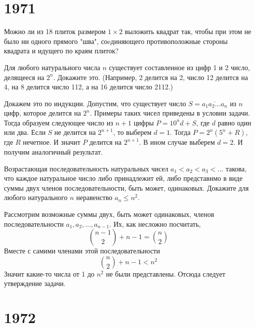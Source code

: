 \documentclass[11pt, a4paper]{template}
\begin{document}
\chapter{1971}

\begin{exercise}[M63]
Можно ли из 18 плиток размером $1 \times 2$ выложить квадрат так, чтобы при этом не было ни одного прямого "шва", соeдиняющего противоположные стороны квадрата и идущего по краям плиток?
\end{exercise}

\begin{exercise}[M113]
Для любого натурального числа $n$ существует составленное из цифр 1 и 2 число, делящееся на $2^{n}$. Докажите это. (Например, 2 делится на 2, число 12 делится на 4, на 8 делится число 112, а на 16 делится число 2112.)
\end{exercise}

\begin{solution}
Докажем это по индукции. Допустим, что существует число $S = \overline{a_{1}a_{2}\dots a_{n}}$ из $n$ цифр, которое делится на $2^{n}$. Примеры таких чисел приведены в условии задачи. Тогда образуем следующее число из $n + 1$ цифры $P = 10^{n} d + S$, где $d$ равно один или два. Если $S$ не делится на $2^{n+1}$, то выберем $d = 1$. Тогда $P = 2^{n}(5^{n} + R)$, где $R$ нечетное. И значит $P$ делится на $2^{n+1}$. В ином случае выберем $d = 2$. И получим аналогичный результат.
\end{solution}

\begin{exercise}
Возрастающая последовательность натуральных чисел $a_{1} < a_{2} < a_{3} < \dots$ такова, что каждое натуральное число либо принадлежит ей, либо представимо в виде суммы двух членов последовательности, быть может, одинаковых. Докажите для любого натурального $n$ неравенство $a_{n} \leqslant n^{2}$.
\end{exercise}

\begin{solution}
Рассмотрим возможные суммы двух, быть может одинаковых, членов последовательности $a_{1}, a_{2}, \dots, a_{n-1}$. Их, как несложно посчитать,
$$
\binom{n-1}{2} + n-1 = \binom{n}{2}
$$
Вместе с самими членами этой последовательности
$$
\binom{n}{2} + n-1 < n^{2}
$$ 
Значит какие-то числа от 1 до $n^{2}$ не были представлены. Отсюда следует утверждение задачи.
\end{solution}

\chapter{1972}
\end{document}
